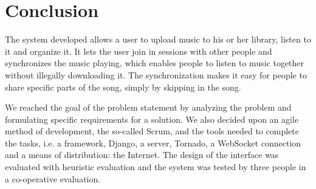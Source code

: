 \section{Conclusion}
The system developed allows a user to upload music to his or her library, listen to it and organize it. It lets the user join
in sessions with other people and synchronizes the music playing, which enables people to listen to music together without
illegally downloading it. The synchronization makes it easy for people to share specific parts of the song, simply by
skipping in the song. 

We reached the goal of the problem statement by analyzing the problem and formulating specific requirements for a solution. We
also decided upon an agile method of development, the so-called Scrum, and the tools needed to complete the tasks, i.e. a
framework, Django, a server, Tornado, a WebSocket connection and a means of distribution: the Internet. The design of the
interface was evaluated with heuristic evaluation and the system was tested by three people in a co-operative evaluation. 